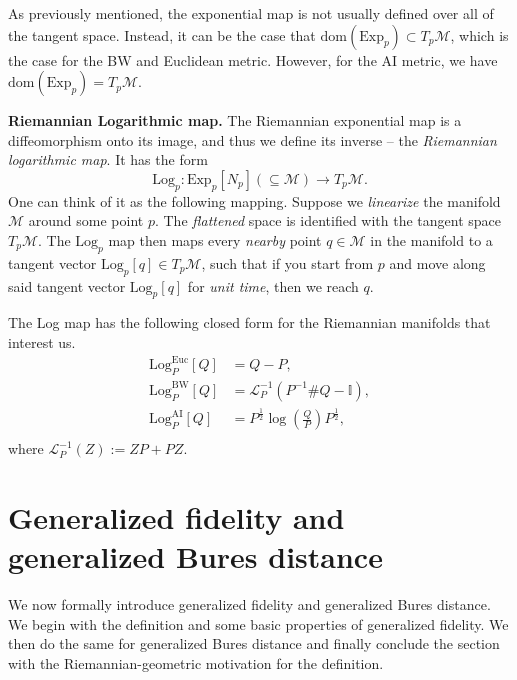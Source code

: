 \documentclass[12pt]{article}
\theoremstyle{definition}
\begin{document}
As previously mentioned, the exponential map is not usually defined over all of the tangent space. Instead, it can be the case that $ \mathrm{dom}(\mathrm{Exp}_p) \subset T_p \mathcal M$, which is the case for the BW and Euclidean metric. However, for the AI metric, we have $\mathrm{dom}(\mathrm{Exp}_p) = T_p \mathcal M$. 

\textbf{Riemannian Logarithmic map.} The Riemannian exponential map is a diffeomorphism onto its image, and thus we define its inverse --  the \textit{Riemannian logarithmic map}. It has the form 
\begin{equation}
     \mathrm{Log}_p : \mathrm{Exp}_p[N_p] (\subseteq \mathcal M ) \to T_p \mathcal M. 
\end{equation}
One can think of it as the following mapping. Suppose we \textit{linearize} the manifold $\mathcal M$ around some point $p$. The \textit{flattened} space is identified with the tangent space $T_p \mathcal M$. The $\mathrm{Log}_p$ map then maps every \textit{nearby} point $q \in \mathcal M$ in the manifold to a tangent vector $\mathrm{Log}_p[q] \in T_p\mathcal M$, such that if you start from $p$ and move along said tangent vector $\mathrm{Log}_p[q]$ for \textit{unit time}, then we reach $q$. 

The Log map has the following closed form for the Riemannian manifolds that interest us. 
\begin{equation}
    \begin{aligned}
            \mathrm{Log}_P^\mathrm{Euc} [Q] &= Q - P, \\
            \mathrm{Log}_P^\mathrm{BW} [Q] &= \mathcal L_P ^{-1} (P ^{-1} \# Q - \mathbb I), \\
            \mathrm{Log}_P^\mathrm{AI} [Q] &= P^{\frac12}  \log\left(\frac QP\right) P^{\frac12} , \\ 
    \end{aligned}
\end{equation}
where $\mathcal L_P^{-1} (Z) := Z P + P Z$. 




\section{Generalized fidelity and generalized Bures distance} \label{Sec:BasicProperties}

We now formally introduce generalized fidelity and generalized Bures distance. We begin with the definition and some basic properties of generalized fidelity. We then do the same for generalized Bures distance and finally conclude the section with the Riemannian-geometric motivation for the definition. 
\end{document}
